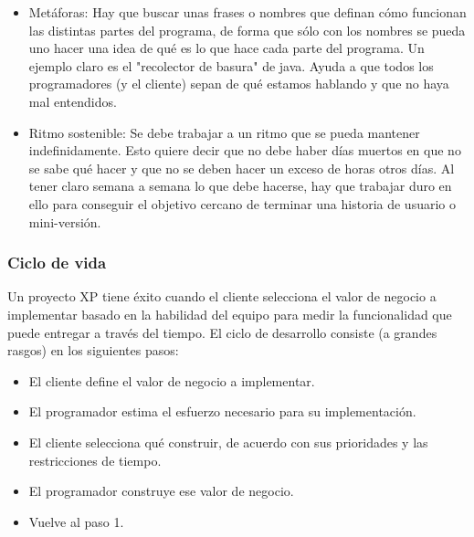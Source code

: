 \begin{itemize}
	\item Metáforas: Hay que buscar unas frases o nombres que definan cómo funcionan las distintas partes del programa, de forma que sólo con los nombres se pueda uno hacer una idea de qué es lo que hace cada parte del programa. Un ejemplo claro es el "recolector de basura" de java. Ayuda a que todos los programadores (y el cliente) sepan de qué estamos hablando y que no haya mal entendidos. 

	\item Ritmo sostenible: Se debe trabajar a un ritmo que se pueda mantener indefinidamente. Esto quiere decir que no debe haber días muertos en que no se sabe qué hacer y que no se deben hacer un exceso de horas otros días. Al tener claro semana a semana lo que debe hacerse, hay que trabajar duro en ello para conseguir el objetivo cercano de terminar una historia de usuario o mini-versión. 


\end{itemize}
\setlength{\parskip}{0mm}
\subsubsection{Ciclo de vida}


\setlength{\parskip}{5mm}
Un proyecto XP tiene éxito cuando el cliente selecciona el valor de negocio a implementar basado en la habilidad del equipo para medir la funcionalidad que puede entregar a través del tiempo. El ciclo de desarrollo consiste (a grandes rasgos) en los siguientes pasos:

\begin{itemize}

	\item El cliente define el valor de negocio a implementar.

	\item El programador estima el esfuerzo necesario para su implementación.

	\item El cliente selecciona qué construir, de acuerdo con sus prioridades y las restricciones de tiempo.

	\item El programador construye ese valor de negocio.

	\item Vuelve al paso 1.

\end{itemize}
    
